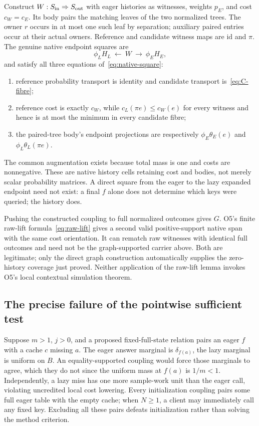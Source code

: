 \documentclass[11pt,a4paper]{article}
\theoremstyle{definition}
\newcommand{\id}{\mathrm{id}}
\begin{document}
Construct $W:S_{\rm in}\Rightarrow S_{\rm out}$ with eager histories
as witnesses, weights $p_E$, and cost $c_W=c_E$. Its body pairs the
matching leaves of the two normalized trees. The owner $r$ occurs in at
most one such leaf by separation; auxiliary paired entries occur at their
actual owners. Reference and candidate witness maps are $\id$ and $\pi$.
The genuine native endpoint squares are
\[
\phi_LH_L\ \longleftarrow\ W\ \longrightarrow\ \phi_EH_E,
\]
and satisfy all three equations of~\eqref{eq:native-square}:
\begin{enumerate}
\item reference probability transport is identity and candidate transport
is~\eqref{eq:C-fibre};
\item reference cost is exactly $c_W$, while
$c_L(\pi e)\leq c_W(e)$ for every witness and hence is at most the
minimum in every candidate fibre;
\item the paired-tree body's endpoint projections are respectively
$\phi_E\theta_E(e)$ and $\phi_L\theta_L(\pi e)$.
\end{enumerate}
The common augmentation exists because total mass is one and costs are
nonnegative. These are native history cells retaining cost and bodies,
not merely scalar probability matrices. A direct square from the eager
to the lazy expanded endpoint need not exist: a final $f$ alone does
not determine which keys were queried; the history does.

Pushing the constructed coupling to full normalized outcomes gives $G$.
O5's finite raw-lift formula~\eqref{eq:raw-lift} gives a second valid
positive-support native span with the same cost orientation. It can
rematch raw witnesses with identical full outcomes and need not be the
graph-supported carrier above. Both are legitimate; only the direct graph
construction automatically supplies the zero-history coverage just proved.
Neither application of the raw-lift lemma invokes O5's local contextual
simulation theorem.

\subsection{The precise failure of the pointwise sufficient test}
Suppose $m>1$, $j>0$, and a proposed fixed-full-state relation pairs an
eager $f$ with a cache $c$ missing $a$. The eager answer marginal is
$\delta_{f(a)}$, the lazy marginal is uniform on $B$. An equality-supported
coupling would force those marginals to agree, which they do not since
the uniform mass at $f(a)$ is $1/m<1$. Independently, a lazy miss has one
more sample-work unit than the eager call, violating uncredited local
cost lowering. Every initialization coupling pairs some full eager table
with the empty cache; when $N\geq1$, a client may immediately call any
fixed key. Excluding all these pairs defeats initialization rather than
solving the method criterion.
\end{document}
